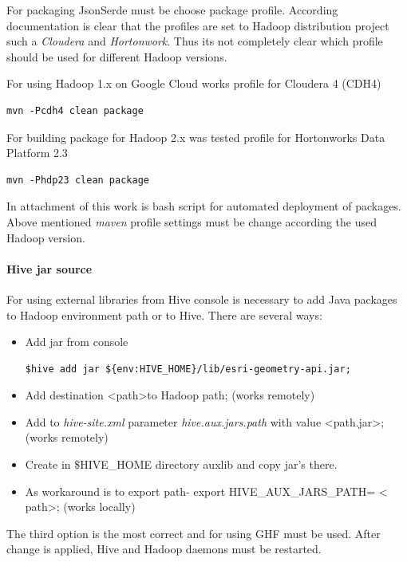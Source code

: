 \documentclass[a4paper,12pt,oneside]{report}
\begin{document}
	For packaging JsonSerde 
	must be choose package profile. According documentation is clear that the
	profiles are set to Hadoop distribution project such a \textit{Cloudera} and
	\textit{Hortonwork}. Thus its not completely clear which profile should be used
	for different Hadoop versions. 
	
	For using Hadoop 1.x on Google Cloud works profile for Cloudera 4 (CDH4)
	\begin{footnotesize}
		\begin{lstlisting}[style=python]
mvn -Pcdh4 clean package
		\end{lstlisting}
	\end{footnotesize}
	For building package for Hadoop 2.x was tested profile for Hortonworks Data
	Platform 2.3
	\begin{footnotesize}
		\begin{lstlisting}[style=python]
mvn -Phdp23 clean package
		\end{lstlisting}
	\end{footnotesize}
	
	In attachment of this work is bash script for automated deployment of packages.
	Above mentioned \textit{maven} profile settings must be change according the
	used Hadoop version.
	
	\paragraph{Hive jar source} For using external libraries from Hive console is
	necessary to add Java packages to Hadoop environment path or to Hive. There are
	several ways:
	\begin{itemize}
		\item Add jar from console 
		\begin{footnotesize}
			\begin{lstlisting}[style=python]
$hive add jar ${env:HIVE_HOME}/lib/esri-geometry-api.jar;
			\end{lstlisting}
		\end{footnotesize}
		\item Add destination \textless path\textgreater to Hadoop path; (works
		remotely)
		\item Add to \textit{hive-site.xml} parameter \textit{hive.aux.jars.path} with
		value \textless path.jar\textgreater; (works remotely)
		\item Create in \$HIVE\_HOME directory auxlib and copy jar's there.
		\item As workaround is to export path-  export HIVE\_AUX\_JARS\_PATH= \textless
		path\textgreater; (works locally)
	\end{itemize}
	The third option is the most correct and for using GHF must be used. After
	change is applied, Hive and Hadoop daemons must be restarted. 
	
\end{document}
